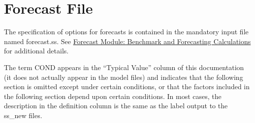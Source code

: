\section{Forecast File}
The specification of options for forecasts is contained in the mandatory input file named forecast.ss. See \hyperref[sec:forecast]{Forecast Module: Benchmark and Forecasting Calculations} for additional details. 

The term COND appears in the ``Typical Value'' column of this documentation (it does not actually appear in the model files) and indicates that the following section is omitted except under certain conditions, or that the factors included in the following section depend upon certain conditions. In most cases, the description in the definition column is the same as the label output to the ss\_new files.


